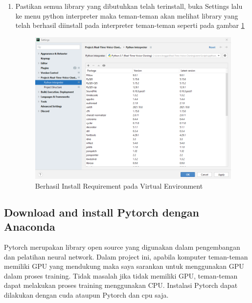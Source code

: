 \begin{enumerate}
\item Pastikan semua library yang dibutuhkan telah terinstall, buka Settings lalu ke menu python interpreter maka teman-teman akan melihat library yang telah berhasil diinstall pada interpreter teman-teman seperti pada gambar \ref{req3}

\begin{figure}[H]
\centering
\includegraphics[scale=.4]{figures/req3}
\caption{Berhasil Install Requirement pada Virtual Environment}
\label{req3}
\end{figure}
\end{enumerate}

\subsection{Download and install Pytorch dengan Anaconda}
Pytorch merupakan library open source yang digunakan dalam pengembangan dan pelatihan neural network. Dalam project ini, apabila komputer teman-teman memiliki GPU yang mendukung maka saya sarankan untuk menggunakan GPU dalam proses training. Tidak masalah jika tidak memiliki GPU, teman-teman dapat melakukan proses training menggunakan CPU. Instalasi Pytorch dapat dilakukan dengan cuda ataupun Pytorch dan cpu saja.

